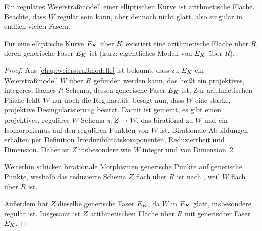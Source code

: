 \begin{Beispiel}\label{bsp:regweierstraßmodell}
  Ein reguläres Weierstraßmodell einer elliptischen Kurve ist
  arithmetische Fläche.
  Beachte, dass $W$ regulär sein kann, aber dennoch nicht glatt, also
  singulär in endlich vielen Fasern.
\end{Beispiel}

\begin{Satz}\label{thm:exarithfl}
  Für eine elliptische Kurve $E_{K}$ über $K$ existiert eine
  arithmetische Fläche über $R$, deren generische Faser $E_{K}$ ist
  (kurz: eigentliches Modell von $E_{K}$ über $R$).
  \begin{proof}
    Aus \autoref{chap:weierstraßmodelle} ist bekannt, dass zu $E_{K}$
    ein Weierstraßmodell $W$ über $R$ gefunden werden kann, das heißt
    ein projektives, integeres, flaches $R$-Schema, dessen generische
    Faser $E_{K}$ ist. Zur arithmetischen Fläche fehlt $W$ nur noch die
    Regularität.
    \cite[Corollary 8.3.51]{liu} besagt nun, dass $W$ eine starke,
    projektive Desingularisierung besitzt. Damit ist gemeint, es gibt
    einen projektives, reguläres $W$-Schema $\pi\colon Z\to W$, das
    birational zu $W$ und ein Isomorphismus auf den regulären Punkten
    von $W$ ist.
    Birationale Abbildungen erhalten per Definition
    Irreduzibilitätskomponenten, Reduziertheit und Dimension.
    Daher ist $Z$ insbesondere wie $W$ integer
    und von Dimension~2.

    Weiterhin schicken birationale Morphismen generische Punkte auf
    generische Punkte, weshalb das reduzierte Schema $Z$ flach über
    $R$ ist nach \cite[Proposition III.9.7]{hartshorne}, weil
    $W$ flach über $R$ ist.

    Außerdem hat $Z$ dieselbe generische Faser $E_{K}$, da
    $W$ in $E_{K}$ glatt, insbesondere regulär ist.
    Insgesamt ist $Z$ arithmetischen Fläche über $R$ mit
    generischer Faser $E_{K}$.
  \end{proof}
\end{Satz}

